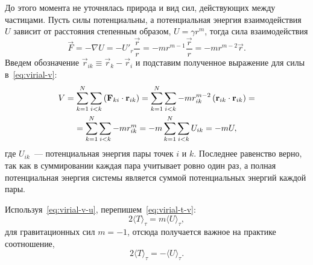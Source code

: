 До этого момента не уточнялась природа и вид сил, действующих между частицами. Пусть силы потенциальны, а потенциальная энергия взаимодействия~$U$ зависит от расстояния степенным образом, $U = \gamma r^m$, тогда сила взаимодействия 
\begin{equation*}
    \vec F = -\nabla U = - U'_r \frac{\vec{r}}{r} = -mr^{m - 1} \frac{\vec{r}}{r} = -m r^{m - 2} \vec r.
\end{equation*}
Введем обозначение $\vec r_{ik} \equiv \vec r_k - \vec r_i$ и подставим полученное выражение для силы в~\eqref{eq:virial-v}:
\begin{multline}
    V 
    = \sum_{k = 1}^N \sum_{i < k} \left(\mathbf{F}_{ki} \cdot \mathbf{r}_{ik} \right)
    = \sum_{k = 1}^N \sum_{i < k} -m r_{ik}^{m - 2} \left(\mathbf{r}_{ik} \cdot \mathbf{r}_{ik} \right) = \\
    = \sum_{k = 1}^N \sum_{i < k} -m r_{ik}^{m}
    = -m \sum_{k = 1}^N \sum_{i < k} U_{ik} = -mU,
    \label{eq:virial-v-u}
\end{multline}
где $U_{ik}$~--- потенциальная энергия пары точек $i$ и $k$. Последнее равенство верно, так как в суммировании каждая пара учитывает ровно один раз, а полная потенциальная энергия системы является суммой потенциальных энергий каждой пары.

Используя~\eqref{eq:virial-v-u}, перепишем~\eqref{eq:virial-t-v}: 
\begin{equation*}
    2 \langle T \rangle_\tau = m \langle U \rangle_\tau,
\end{equation*} 
для гравитационных сил $m = -1$, отсюда получается важное на практике соотношение, 
\begin{equation}
    2\langle T \rangle_\tau = -\langle U \rangle_\tau.
\end{equation}

